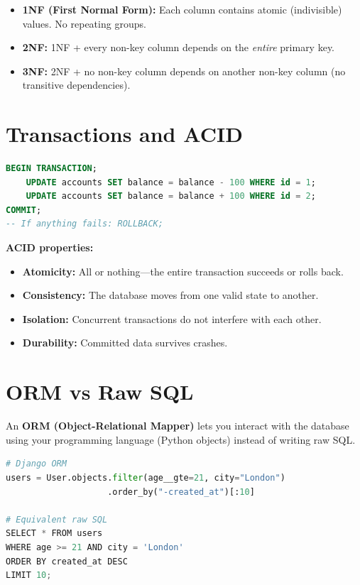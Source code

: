 \documentclass[12pt, a4paper, oneside]{book}
\begin{document}
\begin{itemize}[leftmargin=2em]
    \item \textbf{1NF (First Normal Form):} Each column contains atomic (indivisible) values. No repeating groups.
    \item \textbf{2NF:} 1NF + every non-key column depends on the \emph{entire} primary key.
    \item \textbf{3NF:} 2NF + no non-key column depends on another non-key column (no transitive dependencies).
\end{itemize}

\section{Transactions and ACID}

\begin{lstlisting}[language=SQL, caption={Transactions}]
BEGIN TRANSACTION;
    UPDATE accounts SET balance = balance - 100 WHERE id = 1;
    UPDATE accounts SET balance = balance + 100 WHERE id = 2;
COMMIT;
-- If anything fails: ROLLBACK;
\end{lstlisting}

\textbf{ACID properties:}
\begin{itemize}[leftmargin=2em]
    \item \textbf{Atomicity:} All or nothing---the entire transaction succeeds or rolls back.
    \item \textbf{Consistency:} The database moves from one valid state to another.
    \item \textbf{Isolation:} Concurrent transactions do not interfere with each other.
    \item \textbf{Durability:} Committed data survives crashes.
\end{itemize}

\section{ORM vs Raw SQL}

An \textbf{ORM (Object-Relational Mapper)} lets you interact with the database using your programming language (Python objects) instead of writing raw SQL.

\begin{lstlisting}[language=Python, caption={Django ORM vs Raw SQL}]
# Django ORM
users = User.objects.filter(age__gte=21, city="London")
                    .order_by("-created_at")[:10]

# Equivalent raw SQL
SELECT * FROM users
WHERE age >= 21 AND city = 'London'
ORDER BY created_at DESC
LIMIT 10;
\end{lstlisting}
\end{document}
